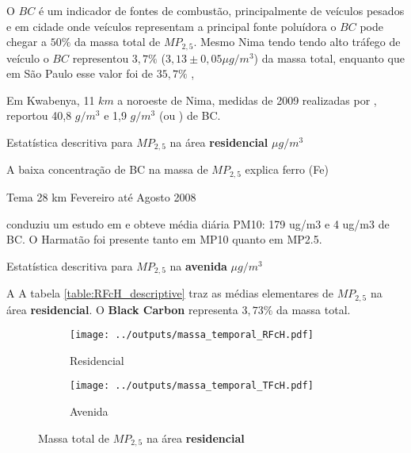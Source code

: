 O $BC$ é um indicador de fontes de combustão, principalmente de veículos pesados e 
em cidade onde veículos representam a principal fonte poluídora o $BC$ pode chegar 
a $50\%$ da massa total de $MP_{2,5}$. 
Mesmo Nima tendo tendo alto tráfego de veículo o $BC$ representou $3,7 \%$ 
($3,13\pm 0,05 \mu g / m^3$) da massa total, enquanto que em São Paulo esse valor foi de 
$35,7 \%$ \citep{andrade2012}, 

Em Kwabenya, 11 $km$ a noroeste de Nima, medidas de 2009 realizadas por 
\citep{aboh2009}, reportou  40,8 $g / m^3$ e 1,9 $g / m^3$ (ou ) de BC.

\begin{table}[H]
  \centering
    
  \caption{Estatística descritiva para $MP_{2,5}$ na área \textbf{residencial}
           $\mu g / m^3$ \label{table:RFcH_descriptive}}
\end{table}

A baixa concentração de BC na massa de $MP_{2,5}$ explica ferro (Fe) 



\citep{ofosu2012} Tema 28 km Fevereiro até Agosto 2008

 conduziu um estudo em 
e obteve média diária PM10: 179 ug/m3 e 4 ug/m3 de BC.
O Harmatão foi presente tanto em MP10 quanto em MP2.5.





\begin{table}[H]
  \centering
    
  \caption{Estatística descritiva para $MP_{2,5}$ na \textbf{avenida}
           $\mu g / m^3$ \label{table:TFcH_descriptive}}
\end{table}

A 
A tabela \ref{table:RFcH_descriptive} traz as médias elementares de $MP_{2,5}$ na área 
\textbf{residencial}.
O \textbf{Black Carbon} representa $3,73 \%$ da massa total.


\begin{figure}[H]
  \centering
  \begin{subfigure}[b]{0.45\textwidth}
    \texttt{[image: ../outputs/massa\_temporal\_RFcH.pdf]}
    \caption{Residencial}
  \end{subfigure}%
  \begin{subfigure}[b]{0.45\textwidth}
    \texttt{[image: ../outputs/massa\_temporal\_TFcH.pdf]}
    \caption{Avenida}
  \end{subfigure}
  \caption{Massa total de $MP_{2,5}$ na área \textbf{residencial} \label{fig:massa_temporal_fino}}
\end{figure}


